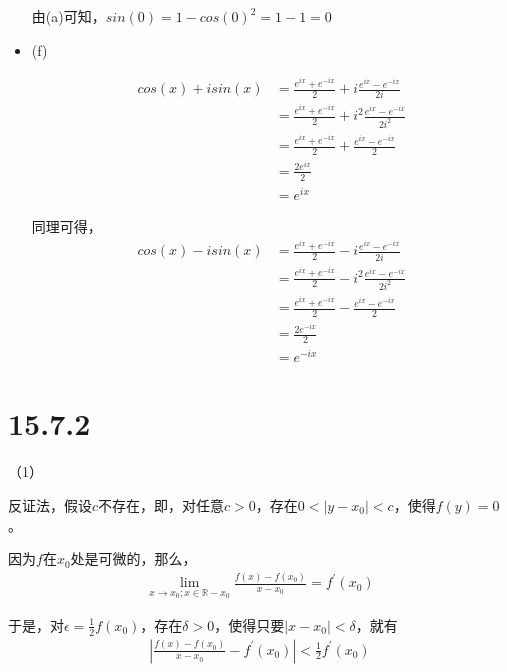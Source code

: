 \documentclass{article}
\begin{document}
\begin{itemize}
        由(a)可知，$sin(0) = 1 - cos(0)^2 = 1 - 1 = 0$


  \item (f)

        \begin{align*}
          cos(x) + isin(x) & = \frac{e^{ix} + e^{-ix}}{2} + i\frac{e^{ix} - e^{-ix}}{2i}     \\
                           & = \frac{e^{ix} + e^{-ix}}{2} + i^2\frac{e^{ix} - e^{-ix}}{2i^2} \\
                           & = \frac{e^{ix} + e^{-ix}}{2} + \frac{e^{ix} - e^{-ix}}{2}       \\
                           & = \frac{2e^{ix}}{2}                                             \\
                           & = e^{ix}
        \end{align*}

        同理可得，
        \begin{align*}
          cos(x) - isin(x) & = \frac{e^{ix} + e^{-ix}}{2} - i\frac{e^{ix} - e^{-ix}}{2i}     \\
                           & = \frac{e^{ix} + e^{-ix}}{2} - i^2\frac{e^{ix} - e^{-ix}}{2i^2} \\
                           & = \frac{e^{ix} + e^{-ix}}{2} - \frac{e^{ix} - e^{-ix}}{2}       \\
                           & = \frac{2e^{-ix}}{2}                                            \\
                           & = e^{-ix}
        \end{align*}

\end{itemize}

\section*{15.7.2}

（1）

反证法，假设$c$不存在，即，对任意$c > 0$，存在$0 < |y - x_0| < c$，使得$f(y) = 0$。

因为$f$在$x_0$处是可微的，那么，
\begin{align*}
  \lim_{x \to x_0;x \in \mathbb{R} - {x_0}} \frac{f(x) - f(x_0)}{x - x_0} = f^\prime(x_0)
\end{align*}

于是，对$\epsilon = \frac{1}{2} f(x_0)$，存在$\delta > 0$，使得只要$|x - x_0| < \delta$，就有
\begin{align*}
  \left|\frac{f(x) - f(x_0)}{x - x_0} - f^\prime(x_0)\right| < \frac{1}{2} f^\prime(x_0) \\
\end{align*}
\end{document}
